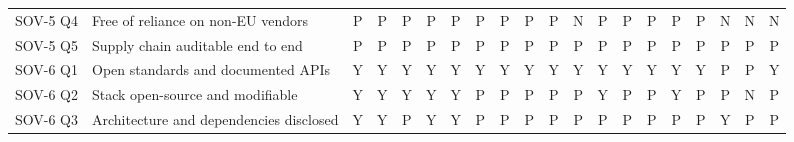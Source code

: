 \begin{table}[p]
\begin{tabular}{@{}l l *{18}{c}@{}}
SOV-5 Q4 & Free of reliance on non-EU vendors & \cellcolor{orange!25}P & \cellcolor{orange!25}P & \cellcolor{orange!25}P & \cellcolor{orange!25}P & \cellcolor{orange!25}P & \cellcolor{orange!25}P & \cellcolor{orange!25}P & \cellcolor{orange!25}P & \cellcolor{orange!25}P & \cellcolor{red!25}N & \cellcolor{orange!25}P & \cellcolor{orange!25}P & \cellcolor{orange!25}P & \cellcolor{orange!25}P & \cellcolor{orange!25}P & \cellcolor{red!25}N & \cellcolor{red!25}N & \cellcolor{red!25}N \\
SOV-5 Q5 & Supply chain auditable end to end & \cellcolor{orange!25}P & \cellcolor{orange!25}P & \cellcolor{orange!25}P & \cellcolor{orange!25}P & \cellcolor{orange!25}P & \cellcolor{orange!25}P & \cellcolor{orange!25}P & \cellcolor{orange!25}P & \cellcolor{orange!25}P & \cellcolor{orange!25}P & \cellcolor{orange!25}P & \cellcolor{orange!25}P & \cellcolor{orange!25}P & \cellcolor{orange!25}P & \cellcolor{orange!25}P & \cellcolor{orange!25}P & \cellcolor{orange!25}P & \cellcolor{orange!25}P \\
\midrule
SOV-6 Q1 & Open standards and documented APIs & \cellcolor{green!22}Y & \cellcolor{green!22}Y & \cellcolor{green!22}Y & \cellcolor{green!22}Y & \cellcolor{green!22}Y & \cellcolor{green!22}Y & \cellcolor{green!22}Y & \cellcolor{green!22}Y & \cellcolor{green!22}Y & \cellcolor{green!22}Y & \cellcolor{green!22}Y & \cellcolor{green!22}Y & \cellcolor{green!22}Y & \cellcolor{green!22}Y & \cellcolor{green!22}Y & \cellcolor{orange!25}P & \cellcolor{orange!25}P & \cellcolor{green!22}Y \\
SOV-6 Q2 & Stack open-source and modifiable & \cellcolor{green!22}Y & \cellcolor{green!22}Y & \cellcolor{green!22}Y & \cellcolor{green!22}Y & \cellcolor{green!22}Y & \cellcolor{orange!25}P & \cellcolor{orange!25}P & \cellcolor{orange!25}P & \cellcolor{orange!25}P & \cellcolor{orange!25}P & \cellcolor{green!22}Y & \cellcolor{orange!25}P & \cellcolor{orange!25}P & \cellcolor{green!22}Y & \cellcolor{orange!25}P & \cellcolor{orange!25}P & \cellcolor{red!25}N & \cellcolor{orange!25}P \\
SOV-6 Q3 & Architecture and dependencies disclosed & \cellcolor{green!22}Y & \cellcolor{green!22}Y & \cellcolor{orange!25}P & \cellcolor{green!22}Y & \cellcolor{green!22}Y & \cellcolor{orange!25}P & \cellcolor{orange!25}P & \cellcolor{orange!25}P & \cellcolor{orange!25}P & \cellcolor{orange!25}P & \cellcolor{orange!25}P & \cellcolor{orange!25}P & \cellcolor{orange!25}P & \cellcolor{orange!25}P & \cellcolor{orange!25}P & \cellcolor{green!22}Y & \cellcolor{orange!25}P & \cellcolor{orange!25}P \\

\end{tabular}
\end{table}
